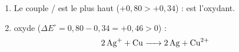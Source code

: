 \documentclass[11pt,a4paper]{article}
\begin{document}
\begin{corrige}
\begin{enumerate}[label=\alph*)]
  \item Le couple / est le plus haut ($+0{,}80>+0{,}34$) :  est l'oxydant.
  \item {} oxyde  ($\Delta E^{\circ}=0{,}80-0{,}34=+0{,}46>0$) :
        \[\ce{2 Ag+ + Cu -> 2 Ag + Cu^{2+}}\]
\end{enumerate}
\end{corrige}
\end{document}
